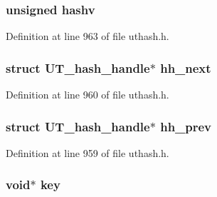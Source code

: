 \subsubsection[{\texorpdfstring{hashv}{hashv}}]{\setlength{\rightskip}{0pt plus 5cm}unsigned hashv}\hypertarget{struct_u_t__hash__handle_ae73531e09ac884600d96a71ad9afbfa4}{}\label{struct_u_t__hash__handle_ae73531e09ac884600d96a71ad9afbfa4}


Definition at line 963 of file uthash.\+h.

\subsubsection[{\texorpdfstring{hh\+\_\+next}{hh_next}}]{\setlength{\rightskip}{0pt plus 5cm}struct {\bf U\+T\+\_\+hash\+\_\+handle}$\ast$ hh\+\_\+next}\hypertarget{struct_u_t__hash__handle_a42ef2993dcaaebd656c4a40d174e0c78}{}\label{struct_u_t__hash__handle_a42ef2993dcaaebd656c4a40d174e0c78}


Definition at line 960 of file uthash.\+h.

\subsubsection[{\texorpdfstring{hh\+\_\+prev}{hh_prev}}]{\setlength{\rightskip}{0pt plus 5cm}struct {\bf U\+T\+\_\+hash\+\_\+handle}$\ast$ hh\+\_\+prev}\hypertarget{struct_u_t__hash__handle_a079301c7093356547fb4601a85503c01}{}\label{struct_u_t__hash__handle_a079301c7093356547fb4601a85503c01}


Definition at line 959 of file uthash.\+h.

\subsubsection[{\texorpdfstring{key}{key}}]{\setlength{\rightskip}{0pt plus 5cm}void$\ast$ key}\hypertarget{struct_u_t__hash__handle_ab5c000aec752f2206131e183daf5efbf}{}\label{struct_u_t__hash__handle_ab5c000aec752f2206131e183daf5efbf}


